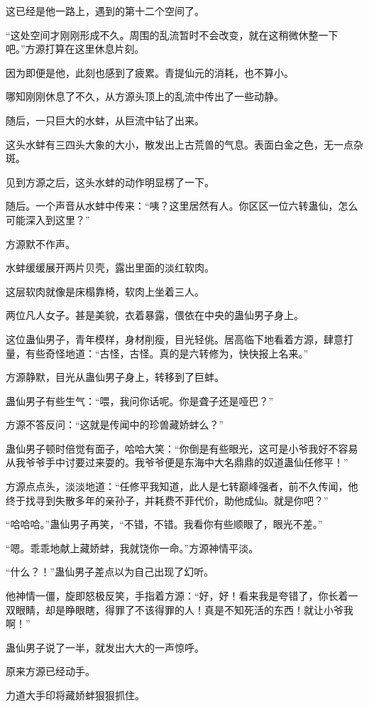 \begin{this_body}
这已经是他一路上，遇到的第十二个空间了。

“这处空间才刚刚形成不久。周围的乱流暂时不会改变，就在这稍微休整一下吧。”方源打算在这里休息片刻。

因为即便是他，此刻也感到了疲累。青提仙元的消耗，也不算小。

哪知刚刚休息了不久，从方源头顶上的乱流中传出了一些动静。

随后，一只巨大的水蚌，从巨流中钻了出来。

这头水蚌有三四头大象的大小，散发出上古荒兽的气息。表面白金之色，无一点杂斑。

见到方源之后，这头水蚌的动作明显楞了一下。

随后。一个声音从水蚌中传来：“咦？这里居然有人。你区区一位六转蛊仙，怎么可能深入到这里？”

方源默不作声。

水蚌缓缓展开两片贝壳，露出里面的淡红软肉。

这层软肉就像是床榻靠椅，软肉上坐着三人。

两位凡人女子。甚是美貌，衣着暴露，偎依在中央的蛊仙男子身上。

这位蛊仙男子，青年模样，身材削瘦，目光轻佻。居高临下地看着方源，肆意打量，有些奇怪地道：“古怪，古怪。真的是六转修为，快快报上名来。”

方源静默，目光从蛊仙男子身上，转移到了巨蚌。

蛊仙男子有些生气：“喂，我问你话呢。你是聋子还是哑巴？”

方源不答反问：“这就是传闻中的珍兽藏娇蚌么？”

蛊仙男子顿时倍觉有面子，哈哈大笑：“你倒是有些眼光，这可是小爷我好不容易从我爷爷手中讨要过来耍的。我爷爷便是东海中大名鼎鼎的奴道蛊仙任修平！”

方源点点头，淡淡地道：“任修平我知道，此人是七转巅峰强者，前不久传闻，他终于找寻到失散多年的亲孙子，并耗费不菲代价，助他成仙。就是你吧？”

“哈哈哈。”蛊仙男子再笑，“不错，不错。我看你有些顺眼了，眼光不差。”

“嗯。乖乖地献上藏娇蚌，我就饶你一命。”方源神情平淡。

“什么？！”蛊仙男子差点以为自己出现了幻听。

他神情一僵，旋即怒极反笑，手指着方源：“好，好！看来我是夸错了，你长着一双眼睛，却是睁眼瞎，得罪了不该得罪的人！真是不知死活的东西！就让小爷我啊！”

蛊仙男子说了一半，就发出大大的一声惊呼。

原来方源已经动手。

力道大手印将藏娇蚌狠狠抓住。


\end{this_body}
